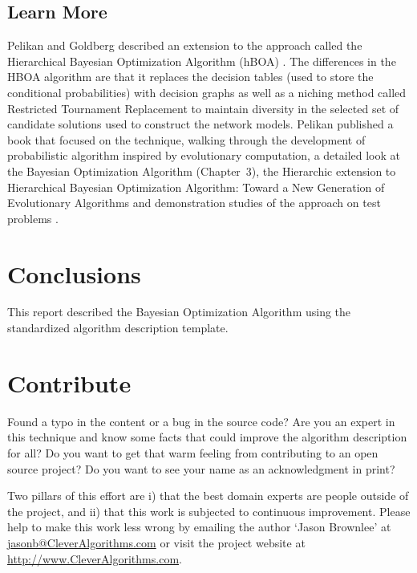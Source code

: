 \documentclass[a4paper, 11pt]{article}
\makeatletter
\newcommand{\myreportauthor}{Jason Brownlee}
\newcommand{\myreportemail}{jasonb@CleverAlgorithms.com}
\newcommand{\myreportwebsite}{http://www.CleverAlgorithms.com}
\makeatother
\begin{document}
\subsection{Learn More}
Pelikan and Goldberg described an extension to the approach called the Hierarchical Bayesian Optimization Algorithm (hBOA) \cite{Pelikan2000, Pelikan2001b}. The differences in the HBOA algorithm are that it replaces the decision tables (used to store the conditional probabilities) with decision graphs as well as a niching method called Restricted Tournament Replacement to maintain diversity in the selected set of candidate solutions used to construct the network models.
Pelikan published a book that focused on the technique, walking through the development of probabilistic algorithm inspired by evolutionary computation, a detailed look at the Bayesian Optimization Algorithm (Chapter~3), the Hierarchic extension to Hierarchical Bayesian Optimization Algorithm: Toward a New Generation of Evolutionary Algorithms and demonstration studies of the approach on test problems \cite{Pelikan2005}.

% 
% 
\section{Conclusions}
\label{sec:conclusions}
This report described the Bayesian Optimization Algorithm using the standardized algorithm description template.

% 
% 
\section{Contribute}
\label{sec:contribute}
Found a typo in the content or a bug in the source code? 
Are you an expert in this technique and know some facts that could improve the algorithm description for all?
Do you want to get that warm feeling from contributing to an open source project? 
Do you want to see your name as an acknowledgment in print?

Two pillars of this effort are i) that the best domain experts are people outside of the project, and ii) that this work is subjected to continuous improvement. 
Please help to make this work less wrong by emailing the author `\myreportauthor' at \url{\myreportemail} or visit the project website at \url{\myreportwebsite}.



\end{document}
